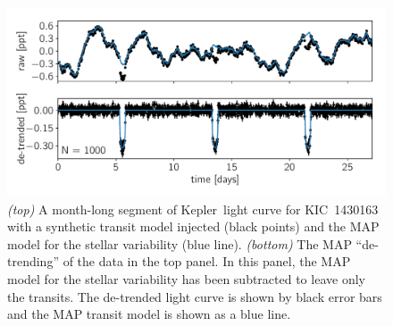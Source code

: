 \documentclass[manuscript, letterpaper]{aastex6}
\newcommand{\project}[1]{\textsf{#1}}
\newcommand{\kepler}{\project{Kepler}}
\newcommand{\figurelabel}[1]{\label{fig:#1}}
\begin{document}
\begin{figure}[!htbp]
\begin{center}
\includegraphics[width=\textwidth]{figures/transit/transit-ml.pdf}
    \caption{\emph{(top)} A month-long segment of \kepler\ light curve for
    KIC~1430163 with a synthetic transit model injected (black points) and the
    MAP model for the stellar variability
    (blue line).
    \emph{(bottom)} The MAP ``de-trending'' of the data in
    the top panel.
    In this panel, the MAP model for the stellar variability
    has been subtracted to leave only the transits.
    The de-trended light curve is shown by black error bars and the MAP
    transit model is shown as a blue line.
    \figurelabel{transit-ml}}
\end{center}
\end{figure}
\end{document}
